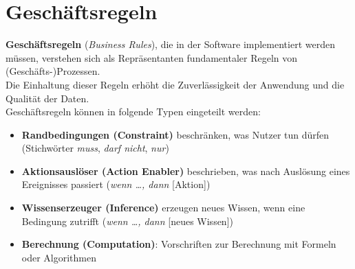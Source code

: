 \section{Geschäftsregeln}


\begin{tcolorbox}[title=Geschäftsregeln]
    \textbf{Geschäftsregeln} (\textit{Business Rules}), die in der Software implementiert werden müssen, verstehen sich als Repräsentanten fundamentaler Regeln von (Geschäfts-)Prozessen.\\
    Die Einhaltung dieser Regeln erhöht die Zuverlässigkeit der Anwendung und die Qualität der Daten.\\

    \noindent
    Geschäftsregeln können in folgende Typen eingeteilt werden:

    \begin{itemize}
        \item \textbf{Randbedingungen (Constraint)} beschränken, was Nutzer tun dürfen (Stichwörter \textit{muss}, \textit{darf nicht}, \textit{nur})
        \item \textbf{Aktionsauslöser (Action Enabler)} beschrieben, was nach Auslösung eines Ereignisses passiert (\textit{wenn \ldots, dann} [Aktion])
        \item \textbf{Wissenserzeuger (Inference)} erzeugen neues Wissen, wenn eine Bedingung zutrifft (\textit{wenn \ldots, dann} [neues Wissen])
        \item \textbf{Berechnung (Computation)}: Vorschriften zur Berechnung mit Formeln oder Algorithmen
    \end{itemize}

\end{tcolorbox}